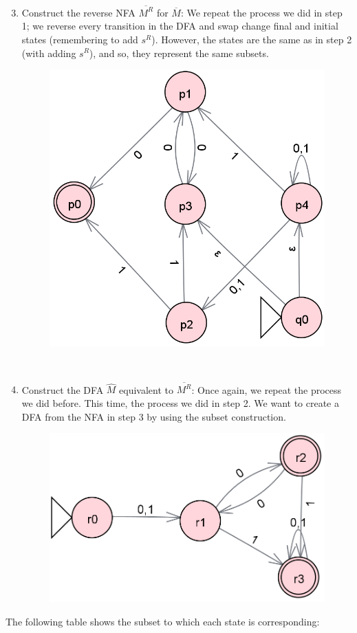 \documentclass[12pt]{article}
\begin{document}
\begin{enumerate}
    \setcounter{enumi}{2}
    \item Construct the reverse NFA $\overline{M^R}$ for $\overline{M}$: We repeat the process we did in step 1; we reverse every transition in the DFA and swap change final and initial states (remembering to add $s^R$). However, the states are the same as in step 2 (with adding $s^R$), and so, they represent the same subsets.

\begin{figure}[h]
    \centering
    \includegraphics[width=0.5\linewidth]{Second_Automaton_Third_Step.png}
\end{figure}

\bigskip\bigskip\bigskip\bigskip\bigskip\bigskip\bigskip\

    \item Construct the DFA $\widehat{M}$ equivalent to $\overline{M^R}$: Once again, we repeat the process we did before. This time, the process we did in step 2. We want to create a DFA from the NFA in step 3 by using the subset construction.

\begin{figure}[h]
    \centering
    \includegraphics[width=0.5\linewidth]{Second_Automaton_Fourth_Step.png}
\end{figure}

\end{enumerate}

The following table shows the subset to which each state is corresponding:
\end{document}
